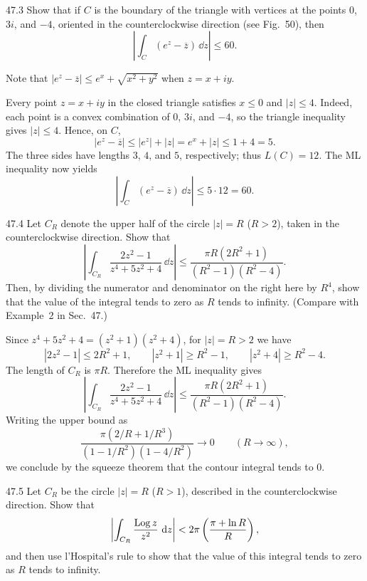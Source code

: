 \documentclass[11pt,oneside]{article}
\begin{document}

\begin{exercise}{47.3}
Show that if $C$ is the boundary of the triangle with vertices at the points $0$, $3i$, and $-4$, oriented in the counterclockwise direction (see Fig.~50), then
\[
    \left|\int_C (e^z-\overline z)\,\dd z\right|\le60.
\]
\begin{suggestion}
Note that $|e^z-\overline z|\le e^x+\sqrt{x^2+y^2}$ when $z=x+iy$.
\end{suggestion}
\end{exercise}

\begin{solution}
Every point $z=x+iy$ in the closed triangle satisfies $x\le0$ and $|z|\le4$. Indeed, each point is a convex combination of $0$, $3i$, and $-4$, so the triangle inequality gives $|z|\le4$. Hence, on $C$,
\[
    |e^z-\overline z|\le |e^z|+|z|=e^x+|z|\le1+4=5.
\]
The three sides have lengths $3$, $4$, and $5$, respectively; thus $L(C)=12$. The ML inequality now yields
\[
    \boxed{\left|\int_C(e^z-\overline z)\,\dd z\right|\le 5\cdot12=60.}
\]
\end{solution}

\begin{exercise}{47.4}
Let $C_R$ denote the upper half of the circle $|z|=R$ ($R>2$), taken in the counterclockwise direction. Show that
\[
    \left|\int_{C_R}\frac{2z^2-1}{z^4+5z^2+4}\,\dd z\right|
    \le\frac{\pi R(2R^2+1)}{(R^2-1)(R^2-4)}.
\]
Then, by dividing the numerator and denominator on the right here by $R^4$, show that the value of the integral tends to zero as $R$ tends to infinity. (Compare with Example~2 in Sec.~47.)
\end{exercise}

\begin{solution}
Since $z^4+5z^2+4=(z^2+1)(z^2+4)$, for $|z|=R>2$ we have
\[
    |2z^2-1|\le2R^2+1, \qquad
    |z^2+1|\ge R^2-1, \qquad
    |z^2+4|\ge R^2-4.
\]
The length of $C_R$ is $\pi R$. Therefore the ML inequality gives
\[
    \boxed{\left|\int_{C_R}\frac{2z^2-1}{z^4+5z^2+4}\,\dd z\right|
    \le\frac{\pi R(2R^2+1)}{(R^2-1)(R^2-4)}.}
\]
Writing the upper bound as
\[
    \frac{\pi(2/R+1/R^3)}{(1-1/R^2)(1-4/R^2)}\longrightarrow0
    \qquad(R\to\infty),
\]
we conclude by the squeeze theorem that the contour integral tends to $0$.
\end{solution}

\begin{exercise}{47.5}
Let $C_R$ be the circle $|z|=R$ ($R>1$), described in the counterclockwise direction. Show that
\[
    \left|\int_{C_R}\frac{\operatorname{Log} z}{z^2}\,\mathop{}\!\mathrm{d} z\right|
    <2\pi\left(\frac{\pi+\ln R}{R}\right),
\]
and then use l'Hospital's rule to show that the value of this integral tends to zero as $R$ tends to infinity.
\end{exercise}
\end{document}
